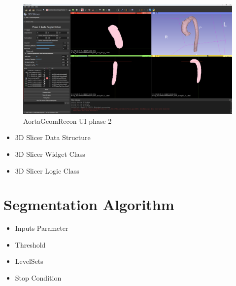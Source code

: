 \begin{figure}[H]
    \centering
    \includegraphics[width=\textwidth]{figures/Sample/SlicerUI_2.png}
    \caption[Single Figure Environment Listed Title]{AortaGeomRecon UI phase 2}
    \label{fig_UI_2}
\end{figure}

\begin{itemize}
\item 3D Slicer Data Structure
\item 3D Slicer Widget Class
\item 3D Slicer Logic Class
\end{itemize}


\section{Segmentation Algorithm}

\begin{itemize}
\item Inputs Parameter
\item Threshold
\item LevelSets
\item Stop Condition
\end{itemize}
%



